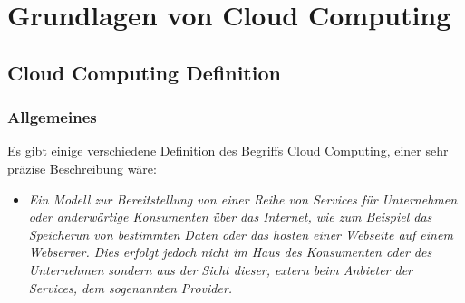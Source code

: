 \chapter{Grundlagen von Cloud Computing}
\putz

\section{Cloud Computing Definition}
\subsection{Allgemeines}
Es gibt einige verschiedene Definition des Begriffs Cloud Computing, einer sehr präzise Beschreibung wäre:

\begin{itemize}
	\item
\textit{Ein Modell zur Bereitstellung von einer Reihe von Services für Unternehmen oder anderwärtige Konsumenten über das Internet, wie zum Beispiel das
Speicherun von bestimmten Daten oder das hosten einer Webseite auf einem Webserver. Dies erfolgt jedoch nicht im Haus des Konsumenten oder des Unternehmen
sondern aus der Sicht dieser, extern beim Anbieter der Services, dem sogenannten Provider.}

\end{itemize}


\newpage
